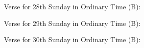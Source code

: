 \documentclass[11pt]{article} %
\begin{document}

\begin{paragraph}\noindent\begin{large}
Verse for 28th Sunday in Ordinary Time (B):
\end{large}\newline\end{paragraph}


\begin{paragraph}\noindent\begin{large}
Verse for 29th Sunday in Ordinary Time (B):
\end{large}\newline\end{paragraph}


\begin{paragraph}\noindent\begin{large}
Verse for 30th Sunday in Ordinary Time (B):
\end{large}\newline\end{paragraph}

\end{document}
